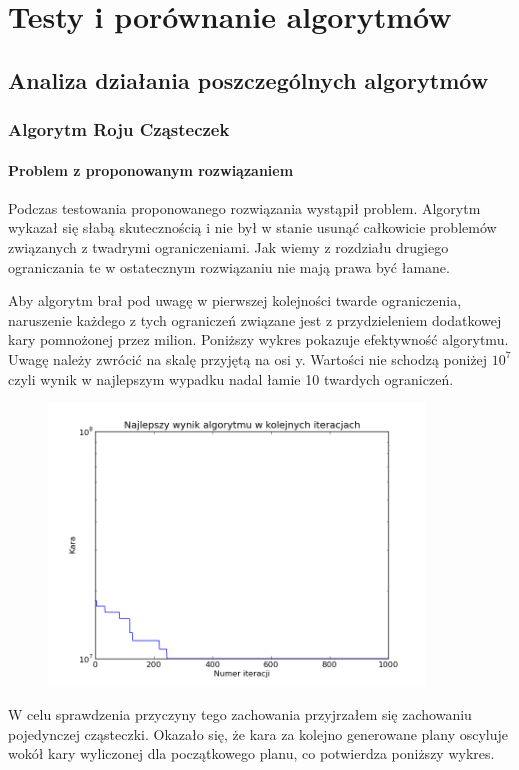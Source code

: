 \chapter{Testy i porównanie algorytmów}
\section{Analiza działania poszczególnych algorytmów}
\subsection{Algorytm Roju Cząsteczek}
\subsubsection{Problem z proponowanym rozwiązaniem}
\par Podczas testowania proponowanego rozwiązania wystąpił problem. Algorytm wykazał się słabą skutecznością i nie był w stanie usunąć całkowicie problemów związanych z twadrymi ograniczeniami. Jak wiemy z rozdziału drugiego ograniczania te w ostatecznym rozwiązaniu nie mają prawa być łamane.
\par Aby algorytm brał pod uwagę w pierwszej kolejności twarde ograniczenia, naruszenie każdego z tych ograniczeń związane jest z przydzieleniem dodatkowej kary pomnożonej przez milion.
Poniższy wykres pokazuje efektywność algorytmu. Uwagę należy zwrócić na skalę przyjętą na osi y. Wartości nie schodzą poniżej $10^{7}$ czyli wynik w najlepszym wypadku nadal łamie 10 twardych ograniczeń.
\begin{figure}[H]
\includegraphics[width=10cm]{img/standard_penalty.png}
\centering
\end{figure}
\par W celu sprawdzenia przyczyny tego zachowania przyjrzałem się zachowaniu pojedynczej cząsteczki. Okazało się, że kara za kolejno generowane plany oscyluje wokół kary wyliczonej dla początkowego planu, co potwierdza poniższy wykres.  
